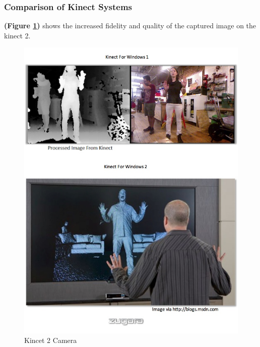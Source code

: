 \documentclass[a4paper,10pt]{article}
\begin{document}
\subsubsection{Comparison of Kinect Systems}
\textbf{(Figure \ref{fig:kimg})} shows the increased fidelity and quality of the captured image on the kinect 2.
\begin{figure}[H]
	\centerline{\includegraphics[scale=0.5]{kinectImg.jpg}}
	\caption{Kincet 2 Camera}
	\label{fig:kimg}
	\end{figure}
	\pagebreak	
	
\end{document}
